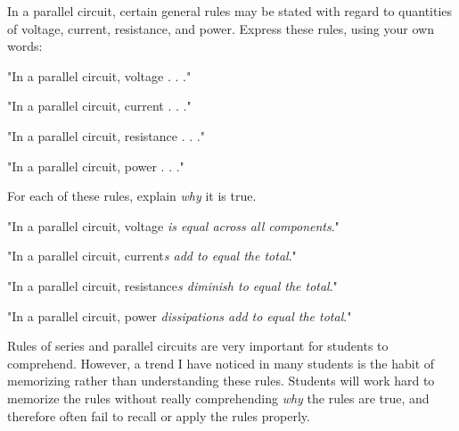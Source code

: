

In a parallel circuit, certain general rules may be stated with regard to quantities of voltage, current, resistance, and power.  Express these rules, using your own words:

\vskip 10pt

\noindent
"In a parallel circuit, voltage . . ."

\vskip 10pt

\noindent
"In a parallel circuit, current . . ."

\vskip 10pt

\noindent
"In a parallel circuit, resistance . . ."

\vskip 10pt

\noindent
"In a parallel circuit, power . . ."

\vskip 10pt

For each of these rules, explain {\it why} it is true.







\noindent
"In a parallel circuit, voltage {\it is equal across all components}."

\vskip 10pt

\noindent
"In a parallel circuit, current{\it s add to equal the total}."

\vskip 10pt

\noindent
"In a parallel circuit, resistance{\it s diminish to equal the total}."

\vskip 10pt

\noindent
"In a parallel circuit, power {\it dissipations add to equal the total}."







Rules of series and parallel circuits are very important for students to comprehend.  However, a trend I have noticed in many students is the habit of memorizing rather than understanding these rules.  Students will work hard to memorize the rules without really comprehending {\it why} the rules are true, and therefore often fail to recall or apply the rules properly.

